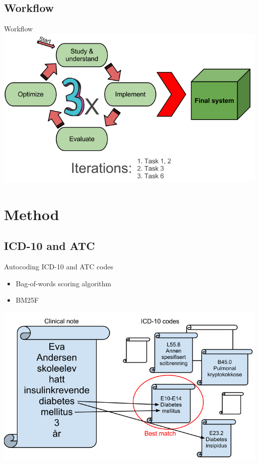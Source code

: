 \documentclass[screen, compress]{beamer}
\begin{document}
\subsection{Workflow}
\begin{frame}{Workflow} %
	\includegraphics[width=\textwidth,height=0.7\textheight]{img/summary}
\end{frame}

\section{Method}

\subsection{ICD-10 and ATC}
\begin{frame}{Autocoding ICD-10 and ATC codes} %
\LARGE
\begin{itemize}
	\item Bag-of-words scoring algorithm
	\item BM25F
\end{itemize}
\includegraphics[width=\textwidth,height=0.7\textheight]{img/bagofwords}
\end{frame}
\end{document}
